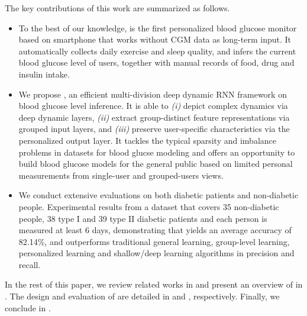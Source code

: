 The key contributions of this work are summarized as follows.
\begin{itemize}
  \item
  To the best of our knowledge, \sysname is the first personalized blood glucose monitor based on smartphone that works without CGM data as long-term input.
  It automatically collects daily exercise and sleep quality, and infers the current blood glucose level of users,  together with manual records of food, drug and insulin intake.
  \item
  We propose \modelname, an efficient multi-division deep dynamic RNN framework on blood glucose level inference. It is able to \emph{(i)} depict complex dynamics via deep dynamic layers, \emph{(ii)} extract group-distinct feature representations via grouped input layers, and \emph{(iii)} preserve user-specific characteristics via the personalized output layer.
\textcolor[rgb]{1.00,0.00,0.00}{ It tackles the typical sparsity and imbalance problems in datasets for blood glucse modeling and offers an opportunity to build blood glucose models for the general public based on limited personal measurements from single-user and grouped-users views.}
  \item
 \textcolor[rgb]{1.00,0.00,0.00}{ We conduct extensive evaluations on both diabetic patients and non-diabetic people.
  Experimental results from a dataset that covers 35 non-diabetic people, 38 type I and 39 type II diabetic patients and each person is measured at least 6 days, demonstrating that \sysname yields an average accuracy of 82.14\%, and outperforms traditional general learning, group-level learning, personalized learning and shallow/deep learning algorithms in precision and recall.}
\end{itemize}

In the rest of this paper, we review related works in  and present an overview of \sysname in .
The design and evaluation of \sysname are detailed in  and , respectively.
Finally, we conclude in .

